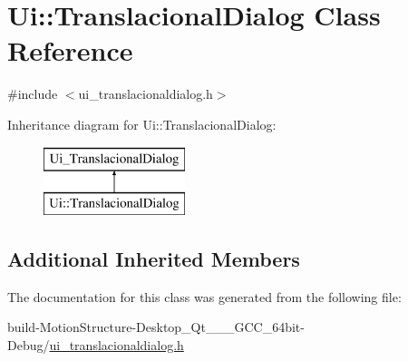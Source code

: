 \hypertarget{class_ui_1_1_translacional_dialog}{\section{Ui\-:\-:Translacional\-Dialog Class Reference}
\label{class_ui_1_1_translacional_dialog}
}


{\ttfamily \#include $<$ui\-\_\-translacionaldialog.\-h$>$}

Inheritance diagram for Ui\-:\-:Translacional\-Dialog\-:\begin{figure}[H]
\begin{center}
\leavevmode
\includegraphics[height=2.000000cm]{class_ui_1_1_translacional_dialog}
\end{center}
\end{figure}
\subsection*{Additional Inherited Members}


The documentation for this class was generated from the following file\-:\begin{DoxyCompactItemize}
\item 
build-\/\-Motion\-Structure-\/\-Desktop\-\_\-\-Qt\-\_\-\_\-\_\-\-G\-C\-C\-\_\-64bit-\/\-Debug/\hyperlink{ui__translacionaldialog_8h}{ui\-\_\-translacionaldialog.\-h}\end{DoxyCompactItemize}
